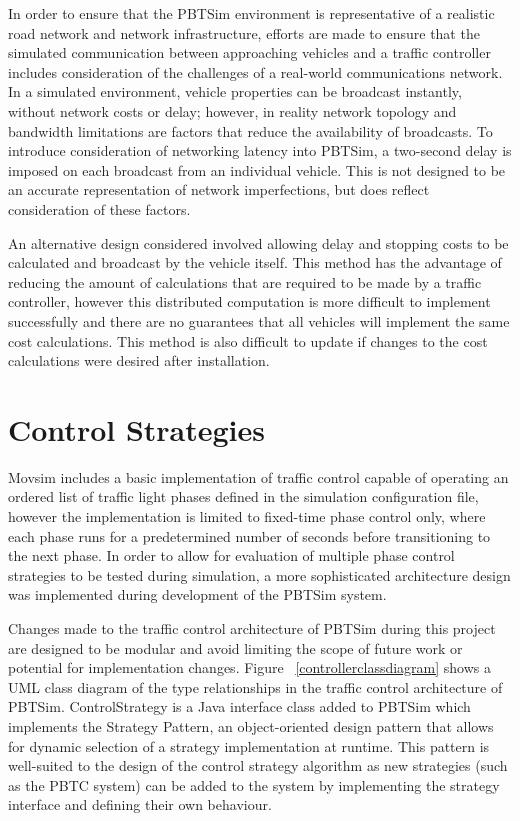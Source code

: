 In order to ensure that the PBTSim environment is representative of a realistic road network and network infrastructure, efforts are made to ensure that the simulated communication between approaching vehicles and a traffic controller includes consideration of the challenges of a real-world communications network. In a simulated environment, vehicle properties can be broadcast instantly, without network costs or delay; however, in reality network topology and bandwidth limitations are factors that reduce the availability of broadcasts. To introduce consideration of networking latency into PBTSim, a two-second delay is imposed on each broadcast from an individual vehicle. This is not designed to be an accurate representation of network imperfections, but does reflect consideration of these factors.

An alternative design considered involved allowing delay and stopping costs to be calculated and broadcast by the vehicle itself. This method has the advantage of reducing the amount of calculations that are required to be made by a traffic controller, however this distributed computation is more difficult to implement successfully and there are no guarantees that all vehicles will implement the same cost calculations. This method is also difficult to update if changes to the cost calculations were desired after installation.

\section{Control Strategies}

Movsim includes a basic implementation of traffic control capable of operating an ordered list of traffic light phases defined in the simulation configuration file, however the implementation is limited to fixed-time phase control only, where each phase runs for a predetermined number of seconds before transitioning to the next phase. In order to allow for evaluation of multiple phase control strategies to be tested during simulation, a more sophisticated architecture design was implemented during development of the PBTSim system. 

Changes made to the traffic control architecture of PBTSim during this project are designed to be modular and avoid limiting the scope of future work or potential for implementation changes. Figure ~\ref{controllerclassdiagram} shows a UML class diagram of the type relationships in the traffic control architecture of PBTSim. ControlStrategy is a Java interface class added to PBTSim which implements the Strategy Pattern, an object-oriented design pattern that allows for dynamic selection of a strategy implementation at runtime. This pattern is well-suited to the design of the control strategy algorithm as new strategies (such as the PBTC system) can be added to the system by implementing the strategy interface and defining their own behaviour. %

